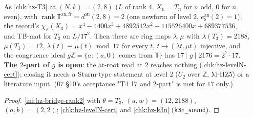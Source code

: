 \begin{theorem}\label{chk:hz-T4}
  \leanok
  As \ref{chk:hz-T3} at $(N,k)=(2,8)$ ($L$ of rank $4$, $X_n=T_n$ for $n$ odd, $0$ for $n$ even), with
  $\operatorname{rank}\mathbb T^{\mathrm{an,fr}}=d^{\mathrm{an}}(2,8)=2$ (one newform of level $2$, $e^{\mathrm{an}}_8(2)=1$), the record's
  $\chi_{\mathbb Z}(X_3)=x^4-4400x^3+4892512x^2-115526400x+689377536$, and TB-mat for $T_3$ on $L/17^2$. Then there are ring maps $\lambda,\mu$ with
  $\lambda(T_3)=2188$, $\mu(T_3)=12$, $\lambda(t)\equiv\mu(t)\bmod17$ for every $t$, $t\mapsto(\lambda t,\mu t)$ injective, and the congruence ideal
  $g\mathbb Z=\{a:(a,0)\text{ comes from }\mathbb T\}$ has $17\mid g\mid2176=2^7\cdot17$. \textbf{The $2$-part of $g$ is open}: the at-root read at
  $2$ reaches nothing (\ref{chk:hz-levelN-cert}); closing it needs a Sturm-type statement at level $2$ ($U_2$ over $\mathbb Z$, M-HZ5) or a
  literature input. (07 \S10's acceptance "T4 17 and 2-part" is met for $17$ only.)
\end{theorem}
\begin{proof}
  \leanok
  \ref{inf:hz-bridge-rank2} with $\theta=T_3$, $(u,w)=(12,2188)$, $(a,b)=(2,2)$; \ref{chk:hz-levelN-cert} and \ref{chk:hz-k3n} (\texttt{k3n\_sound}).
\end{proof}


